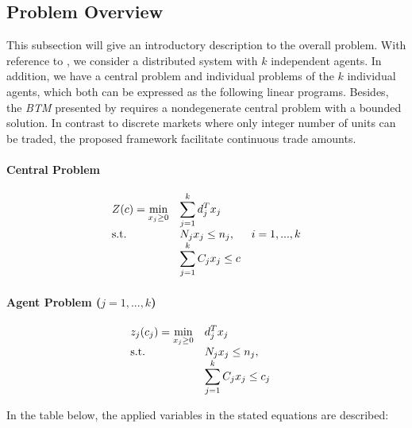 \subsection{Problem Overview}
\label{sec:btm_problem_overview}
This subsection will give an introductory description to the overall problem. 
With reference to , we consider a distributed 
system with $k$ independent agents.
In addition, we have a central problem and individual 
problems of the $k$ individual agents, which both can be expressed as the following 
linear programs. Besides, the \textit{BTM} presented by  requires 
a nondegenerate central problem with a bounded solution. In contrast to discrete markets where 
only integer number of units can be traded, the proposed framework facilitate continuous 
trade amounts. 

\paragraph*{Central Problem}
\begin{equation}
    \begin{array}{ll@{}ll}
        Z(c) = \underset{x_{j} \geq 0}{\text{min}}  & \displaystyle\sum\limits_{j=1}^{k} d^{T}_{j}x_{j} &\\
        \text{s.t.}& \displaystyle N_{j}x_{j} \leq n_{j}, &&i=1 ,..., k  \\
                    & \displaystyle\sum\limits_{j=1}^{k} C_{j}x_{j} \leq c
    \end{array}
\end{equation}

\paragraph*{Agent Problem ($j=1, ..., k$)}
\begin{equation}
    \begin{array}{ll@{}ll}
        z_{j}(c_{j}) =  \underset{x_{j} \geq 0}{\text{min}}  & \displaystyle d^{T}_{j}x_{j} &\\
        \text{s.t.}& \displaystyle N_{j}x_{j} \leq n_{j}, &&\\
                    & \displaystyle\sum\limits_{j=1}^{k} C_{j}x_{j} \leq c_{j}
    \end{array}
\end{equation}

In the table below, the applied variables in the stated equations are described:


